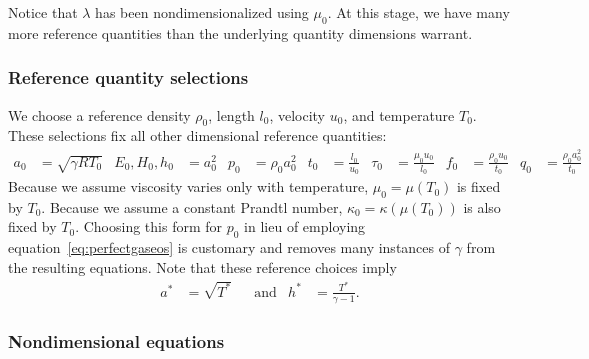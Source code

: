 \documentclass[letterpaper,11pt,nointlimits,reqno,draft]{amsart}
\begin{document}
Notice that $\lambda$ has been nondimensionalized using $\mu_{0}$.  At this
stage, we have many more reference quantities than the underlying quantity
dimensions warrant.

\subsubsection{Reference quantity selections}
\label{sec:nondimrefq}

We choose a reference density $\rho_{0}$, length $l_{0}$, velocity $u_{0}$, and
temperature $T_{0}$.  These selections fix all other dimensional reference
quantities:
\begin{align}
  a_{0} &= \sqrt{\gamma{}RT_{0}}
  &
  E_{0}, H_{0}, h_{0} &= a_{0}^{2}
  &
  p_{0} &= \rho_{0} a_{0}^{2}
  &
  t_{0} &= \frac{l_{0}}{u_{0}}
  &
  \tau_{0} &= \frac{\mu_{0}u_{0}}{l_{0}}
  &
  f_{0} &= \frac{\rho_{0}u_{0}}{t_{0}}
  &
  q_{0} &= \frac{\rho_{0}a_{0}^{2}}{t_{0}}
\end{align}
Because we assume viscosity varies only with temperature, $\mu_{0}=\mu\!\left(
T_{0} \right)$ is fixed by $T_{0}$.  Because we assume a constant Prandtl
number, $\kappa_{0}=\kappa\!\left( \mu\!\left( T_{0} \right) \right)$ is also
fixed by $T_{0}$.  Choosing this form for $p_{0}$ in lieu of employing
equation~\eqref{eq:perfectgaseos} is customary and removes many instances of
$\gamma$ from the resulting equations.  Note that these reference choices imply
\begin{align}
a^{*}&=\sqrt{T^{*}}
&
&\text{and}
&
h^{*}&=\frac{T^{*}}{\gamma-1}
.
\end{align}

\subsubsection{Nondimensional equations}
\label{nondim_equations}
\end{document}
